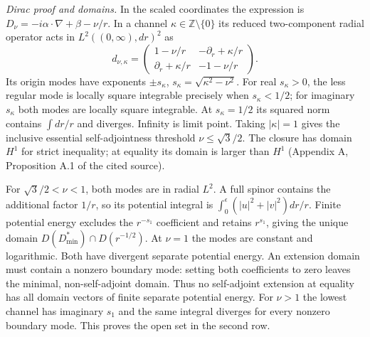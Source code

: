 \documentclass[11pt,a4paper]{article}
\begin{document}
\emph{Dirac proof and domains.} In the scaled coordinates the expression
is \(D_\nu=-i\alpha\cdot\nabla+\beta-\nu/r\). In a channel
\(\kappa\in\mathbb Z\setminus\{0\}\) its reduced two-component radial
operator acts in \(L^2((0,\infty),dr)^2\) as
\[d_{\nu,\kappa}=\begin{pmatrix}
1-\nu/r&-\partial_r+\kappa/r\\
\partial_r+\kappa/r&-1-\nu/r
\end{pmatrix}.\] Its origin modes have exponents \(\pm s_\kappa\),
\(s_\kappa=\sqrt{\kappa^2-\nu^2}\). For real \(s_\kappa>0\), the less
regular mode is locally square integrable precisely when
\(s_\kappa<1/2\); for imaginary \(s_\kappa\) both modes are locally
square integrable. At \(s_\kappa=1/2\) its squared norm contains
\(\int dr/r\) and diverges. Infinity is limit point. Taking
\(|\kappa|=1\) gives the inclusive essential self-adjointness threshold
\(\nu\le\sqrt3/2\). The closure has domain \(H^1\) for strict
inequality; at equality its domain is larger than \(H^1\) (Appendix A,
Proposition A.1 of the cited source).

For \(\sqrt3/2<\nu<1\), both modes are in radial \(L^2\). A full spinor
contains the additional factor \(1/r\), so its potential integral is
\(\int_0^\epsilon(|u|^2+|v|^2)dr/r\). Finite potential energy excludes
the \(r^{-s_1}\) coefficient and retains \(r^{s_1}\), giving the unique
domain \(D(D_{\min}^*)\cap D(r^{-1/2})\). At \(\nu=1\) the modes are
constant and logarithmic. Both have divergent separate potential energy.
An extension domain must contain a nonzero boundary mode: setting both
coefficients to zero leaves the minimal, non-self-adjoint domain. Thus
no self-adjoint extension at equality has all domain vectors of finite
separate potential energy. For \(\nu>1\) the lowest channel has
imaginary \(s_1\) and the same integral diverges for every nonzero
boundary mode. This proves the open set in the second row.
\end{document}
